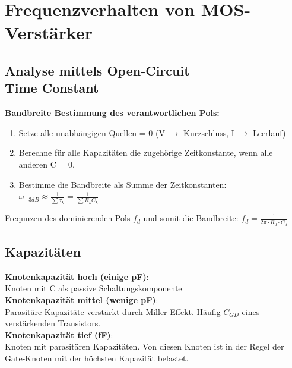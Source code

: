 \section{Frequenzverhalten von MOS-Verstärker}
\begin{minipage}{0.5\linewidth}
\subsection{Analyse mittels Open-Circuit\\ Time Constant}
\textbf{Bandbreite Bestimmung des verantwortlichen Pols:}
\begin{enumerate}[noitemsep,topsep=0pt]
    \item Setze alle unabhängigen Quellen = 0 (V $\rightarrow$ Kurzschluss, I $\rightarrow$ Leerlauf)
    \item Berechne für alle Kapazitäten die zugehörige Zeitkonstante, wenn alle anderen C = 0.
    \item Bestimme die Bandbreite als Summe der Zeitkonstanten: $\omega_{-3dB} \approx \frac{1}{\sum\tau_k}=\frac{1}{\sum R_kC_k}$
\end{enumerate}
Frequnzen des dominierenden Pols $f_d$ und somit die Bandbreite: $f_d = \frac{1}{2\pi\cdot R_d\cdot C_d}$
\subsection{Kapazitäten}
\textbf{Knotenkapazität hoch (einige pF)}:\\
Knoten mit C als passive Schaltungskomponente\\
\textbf{Knotenkapazität mittel (wenige pF)}:\\
Parasitäre Kapazitäte verstärkt durch Miller-Effekt. Häufig $C_{GD}$ eines verstärkenden Transistors.\\
\textbf{Knotenkapazität tief (fF)}:\\
Knoten mit parasitären Kapazitäten. Von diesen Knoten ist in der Regel der Gate-Knoten mit der höchsten Kapazität belastet.\\
\end{minipage}\hspace{5pt}%
